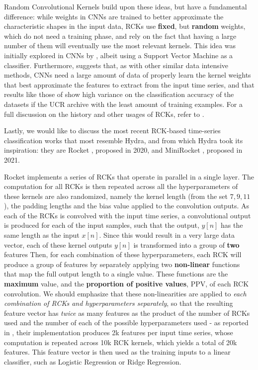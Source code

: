 Random Convolutional Kernels build upon these ideas, but have a fundamental difference: while weights in CNNs are trained to better approximate the characteristic shapes in the input data, RCKs use \textbf{fixed}, but \textbf{random} weights, which do not need a training phase, and rely on the fact that having a large number of them will eventually
use the most relevant kernels. This idea was initially explored in CNNs by \cite{Saxe2011random}, albeit using a Support Vector Machine as a classifier. 
Furthermore, \cite{Dempster2020} suggests that, as with other similar data intensive methods, CNNs need a large amount of data of properly learn the kernel weights that best approximate the features to extract from the input time series, and that results like those of \cite{Fawaz2020} show high variance on the classification accuracy of the datasets
if the UCR archive with the least amount of training examples. For a full discussion on the history and other usages of RCKs, refer to \cite{Dempster2020}.

Lastly, we would like to discuss the most recent RCK-based time-series classification works that most resemble Hydra, and from which Hydra took its inspiration: they are Rocket \cite{Dempster2020}, proposed in 2020, and MiniRocket \cite{Dempster2021MR}, proposed in 2021.

Rocket \cite{Dempster2020} implements a series of RCKs that operate in parallel in a single layer. The computation for all RCKs is then repeated across all the hyperparameters of these kernels are also randomized, namely the kernel length (from the set ${7, 9, 11}$), the padding lengths and the bias value applied to the convolution outputs. 
As each of the RCKs is convolved with the input time series, a convolutional output is produced for each of the input samples, such that the output, $y[n]$ has the same length as the input $x[n]$. Since this would result in a very large data vector, each of these kernel outputs $y[n]$ is transformed into a group of \textbf{two} features
Then, for each combination of these hyperparameters, each RCK will produce a group of features by separately applying two \textbf{non-linear} functions that map the full output length to a single value. These functions are the \textbf{maximum} value, and the \textbf{proportion of positive values}, PPV,  of each RCK convolution. We should emphasize that these
non-linearities are applied to \emph{each combination of RCKs and hyperparameters separately}, so that the resulting feature vector has \emph{twice} as many features as the product of the number of RCKs used and the number of each of the possible hyperparameters used - as reported in \cite{Dempster2020}, their implementation produces 2k features
per input time series, whose computation is repeated across 10k RCK kernels, which yields a total of 20k features. This feature vector is then used as the training inputs to a linear classifier, such as Logistic Regression or Ridge Regression.

